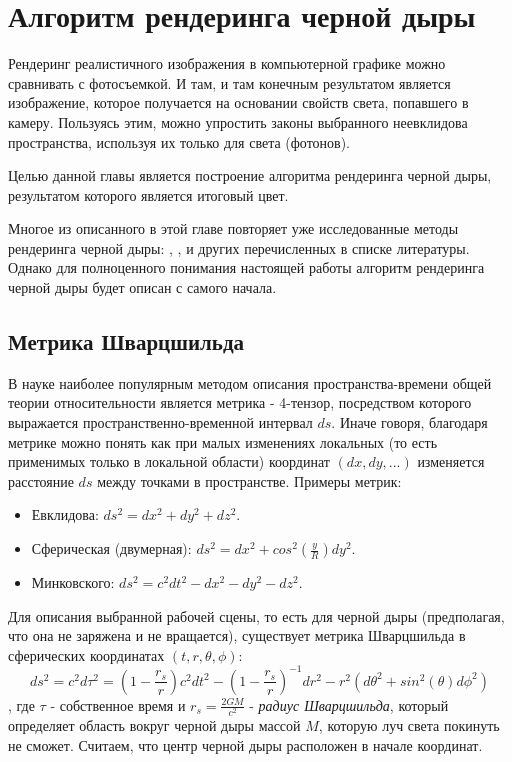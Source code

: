 \section{Алгоритм рендеринга черной дыры}
\label{sec:Chapter1} 

Рендеринг реалистичного изображения в компьютерной графике можно сравнивать с фотосъемкой. И там, и там конечным результатом является изображение, которое получается на основании свойств света, попавшего в камеру. Пользуясь этим, можно упростить законы выбранного неевклидова пространства, используя их только для света (фотонов).

Целью данной главы является построение алгоритма рендеринга черной дыры, результатом которого является итоговый цвет.

Многое из описанного в этой главе повторяет уже исследованные методы рендеринга черной дыры: \cite{bruneton2020}, \cite{SHolloway_2020}, \cite{Riazuelo_2019} и других перечисленных в списке литературы. Однако для полноценного понимания настоящей работы алгоритм рендеринга черной дыры будет описан с самого начала.

\subsection{Метрика Шварцшильда}

В науке наиболее популярным методом описания пространства-времени общей теории относительности является метрика - 4-тензор, посредством которого выражается пространственно-временной интервал $ds$. Иначе говоря, благодаря метрике можно понять как при малых изменениях локальных (то есть применимых только в локальной области) координат $(dx, dy, ...)$ изменяется расстояние $ds$ между точками в пространстве. Примеры метрик:
\begin{itemize}
  \item Евклидова: $ds^2=dx^2+dy^2+dz^2$.
  \item Сферическая (двумерная): $ds^2=dx^2+cos^2(\frac{y}{R})dy^2$.
  \item Минковского: $ds^2=c^2dt^2-dx^2-dy^2-dz^2$.
\end{itemize}

Для описания выбранной рабочей сцены, то есть для черной дыры (предполагая, что она не заряжена и не вращается), существует метрика Шварцшильда в сферических координатах $(t, r, \theta, \phi)$:
\begin{equation}
\label{eq:schwarzschild_metric}
    ds^2 = c^2d\tau^2 = \left(1-\frac{r_s}{r}\right)c^{2}dt^{2} - \left(1-\frac{r_s}{r}\right)^{-1}dr^2 - r^2\left(d\theta^2+sin^2(\theta)d\phi^2\right)
\end{equation}
, где $\tau$ - собственное время и $r_s = \frac{2GM}{c^2}$ - \textit{радиус Шварцшильда}, который определяет область вокруг черной дыры массой $M$, которую луч света покинуть не сможет. Считаем, что центр черной дыры расположен в начале координат.

